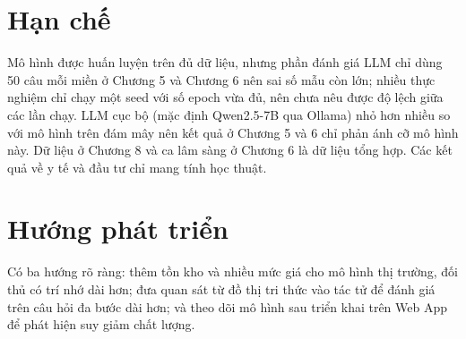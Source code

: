 \section*{Hạn chế}
Mô hình được huấn luyện trên đủ dữ liệu, nhưng phần đánh giá LLM chỉ dùng 50 câu mỗi miền ở Chương 5 và Chương 6 nên sai số mẫu còn lớn; nhiều thực nghiệm chỉ chạy một seed với số epoch vừa đủ, nên chưa nêu được độ lệch giữa các lần chạy. LLM cục bộ (mặc định Qwen2.5-7B qua Ollama) nhỏ hơn nhiều so với mô hình trên đám mây nên kết quả ở Chương 5 và 6 chỉ phản ánh cỡ mô hình này. Dữ liệu ở Chương 8 và ca lâm sàng ở Chương 6 là dữ liệu tổng hợp. Các kết quả
về y tế và đầu tư chỉ mang tính học thuật.

\section*{Hướng phát triển}
Có ba hướng rõ ràng: thêm tồn kho và nhiều mức giá cho mô hình thị trường, đối thủ có trí nhớ dài hơn; đưa quan sát từ đồ thị tri thức vào tác tử để đánh giá trên câu hỏi đa bước dài hơn; và theo dõi mô hình sau triển khai trên Web App để phát hiện suy giảm chất lượng.
